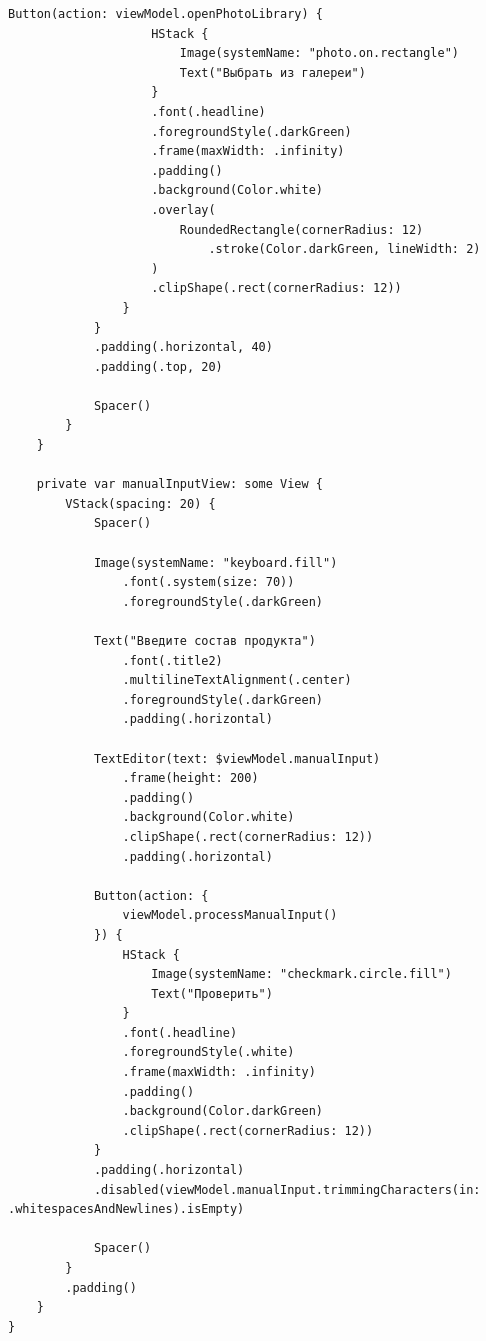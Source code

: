 \begin{lstlisting}[basicstyle=\tiny\ttfamily,breaklines=true]
                Button(action: viewModel.openPhotoLibrary) {
                    HStack {
                        Image(systemName: "photo.on.rectangle")
                        Text("Выбрать из галереи")
                    }
                    .font(.headline)
                    .foregroundStyle(.darkGreen)
                    .frame(maxWidth: .infinity)
                    .padding()
                    .background(Color.white)
                    .overlay(
                        RoundedRectangle(cornerRadius: 12)
                            .stroke(Color.darkGreen, lineWidth: 2)
                    )
                    .clipShape(.rect(cornerRadius: 12))
                }
            }
            .padding(.horizontal, 40)
            .padding(.top, 20)
            
            Spacer()
        }
    }
    
    private var manualInputView: some View {
        VStack(spacing: 20) {
            Spacer()
            
            Image(systemName: "keyboard.fill")
                .font(.system(size: 70))
                .foregroundStyle(.darkGreen)
        
            Text("Введите состав продукта")
                .font(.title2)
                .multilineTextAlignment(.center)
                .foregroundStyle(.darkGreen)
                .padding(.horizontal)
            
            TextEditor(text: $viewModel.manualInput)
                .frame(height: 200)
                .padding()
                .background(Color.white)
                .clipShape(.rect(cornerRadius: 12))
                .padding(.horizontal)
            
            Button(action: {
                viewModel.processManualInput()
            }) {
                HStack {
                    Image(systemName: "checkmark.circle.fill")
                    Text("Проверить")
                }
                .font(.headline)
                .foregroundStyle(.white)
                .frame(maxWidth: .infinity)
                .padding()
                .background(Color.darkGreen)
                .clipShape(.rect(cornerRadius: 12))
            }
            .padding(.horizontal)
            .disabled(viewModel.manualInput.trimmingCharacters(in: .whitespacesAndNewlines).isEmpty)
            
            Spacer()
        }
        .padding()
    }
}
\end{lstlisting}

